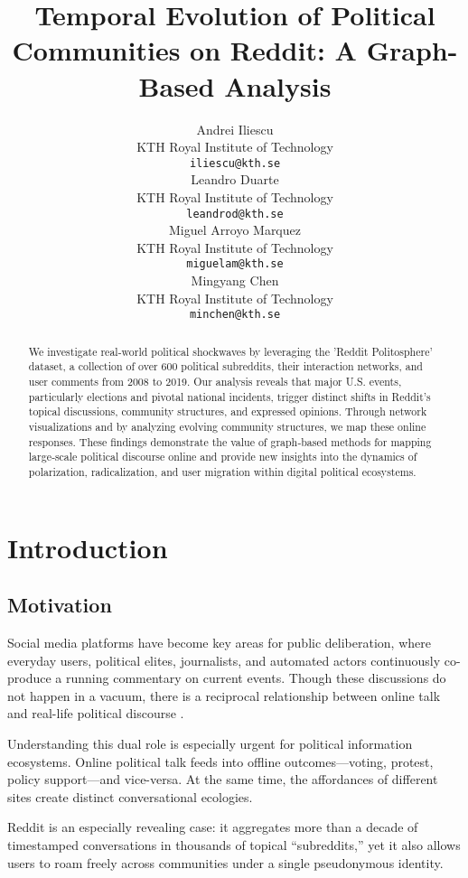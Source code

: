 \documentclass{article}
\title{Temporal Evolution of Political Communities on Reddit: A Graph-Based Analysis}
\author{
  Andrei Iliescu \\
  KTH Royal Institute of Technology\\
  \texttt{iliescu@kth.se} \\
  \And
  Leandro Duarte \\
  KTH Royal Institute of Technology\\
  \texttt{leandrod@kth.se} \\
  \And
  Miguel Arroyo Marquez \\
  KTH Royal Institute of Technology\\
  \texttt{miguelam@kth.se} \\
  \And
  Mingyang Chen \\
  KTH Royal Institute of Technology\\
  \texttt{minchen@kth.se} \\
}
\begin{document}
\maketitle

\begin{abstract}
 We investigate real-world political shockwaves by leveraging the 'Reddit Politosphere' dataset, a collection of over 600 political subreddits, their interaction networks, and user comments from 2008 to 2019. Our analysis reveals that major U.S. events, particularly elections and pivotal national incidents, trigger distinct shifts in Reddit's topical discussions, community structures, and expressed opinions. Through network visualizations and by analyzing evolving community structures, we map these online responses. These findings demonstrate the value of graph‐based methods for mapping large‐scale political discourse online and provide new insights into the dynamics of polarization, radicalization, and user migration within digital political ecosystems.
\end{abstract}


\section{Introduction}

\subsection{Motivation}

Social media platforms have become key areas for public deliberation, where everyday users, political elites, journalists, and automated actors continuously co-produce a running commentary on current events. Though these discussions do not happen in a vacuum, there is a reciprocal relationship between online talk and real-life political discourse \cite{effectnewsitaly}. 

Understanding this dual role is especially urgent for political information ecosystems. Online political talk feeds into offline outcomes—voting, protest, policy support—and vice-versa. At the same time, the affordances of different sites create distinct conversational ecologies.

Reddit is an especially revealing case: it aggregates more than a decade of timestamped conversations in thousands of topical “subreddits,” yet it also allows users to roam freely across communities under a single pseudonymous identity.
\end{document}
